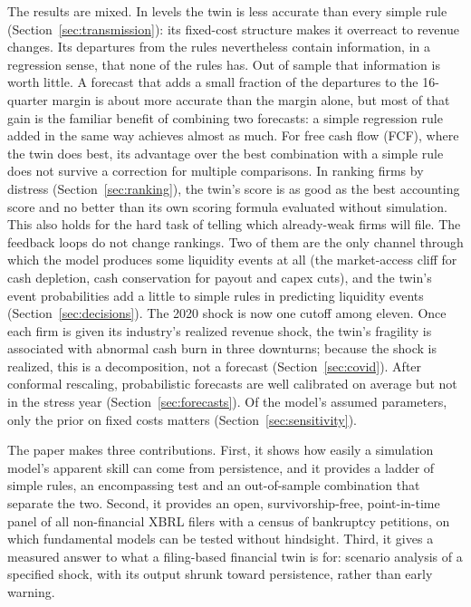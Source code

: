 \documentclass[11pt]{article}
\begin{document}
The results are mixed. In levels the twin is less accurate than every simple rule (Section~\ref{sec:transmission}): its fixed-cost structure makes it overreact to revenue changes. Its departures from the rules nevertheless contain information, in a regression sense, that none of the rules has. Out of sample that information is worth little. A forecast that adds a small fraction of the departures to the 16-quarter margin is about \TrHybGainPct{} more accurate than the margin alone, but most of that gain is the familiar benefit of combining two forecasts: a simple regression rule added in the same way achieves almost as much. For free cash flow (FCF), where the twin does best, its advantage over the best combination with a simple rule does not survive a correction for multiple comparisons. In ranking firms by distress (Section~\ref{sec:ranking}), the twin's score is as good as the best accounting score and no better than its own scoring formula evaluated without simulation. This also holds for the hard task of telling which already-weak firms will file. The feedback loops do not change rankings. Two of them are the only channel through which the model produces some liquidity events at all (the market-access cliff for cash depletion, cash conservation for payout and capex cuts), and the twin's event probabilities add a little to simple rules in predicting liquidity events (Section~\ref{sec:decisions}). The 2020 shock is now one cutoff among eleven. Once each firm is given its industry's realized revenue shock, the twin's fragility is associated with abnormal cash burn in three downturns; because the shock is realized, this is a decomposition, not a forecast (Section~\ref{sec:covid}). After conformal rescaling, probabilistic forecasts are well calibrated on average but not in the stress year (Section~\ref{sec:forecasts}). Of the model's assumed parameters, only the prior on fixed costs matters (Section~\ref{sec:sensitivity}).

The paper makes three contributions. First, it shows how easily a simulation model's apparent skill can come from persistence, and it provides a ladder of simple rules, an encompassing test \citep{chong1986,fair1990} and an out-of-sample combination \citep{bates1969} that separate the two. Second, it provides an open, survivorship-free, point-in-time panel of all non-financial XBRL filers with a census of bankruptcy petitions, on which fundamental models can be tested without hindsight. Third, it gives a measured answer to what a filing-based financial twin is for: scenario analysis of a specified shock, with its output shrunk toward persistence, rather than early warning.
\end{document}

